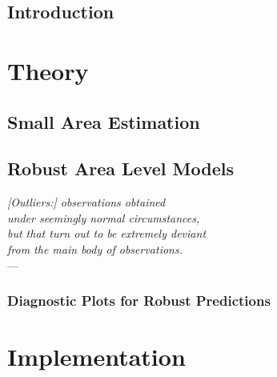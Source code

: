 % 

\chapter{Introduction}



\part{Theory}\label{part:theory}

\chapter{Small Area Estimation}









\chapter{Robust Area Level Models}\label{chap:rfh}
\begin{flushright}{\slshape
[Outliers:] observations obtained \\
under seemingly normal circumstances, \\
but that turn out to be extremely deviant \\
from the main body of observations.} \\ \medskip
--- \cite[69]{Abe95}
\end{flushright}





\section{Diagnostic Plots for Robust Predictions}


\part{Implementation}\label{part:implementation}

